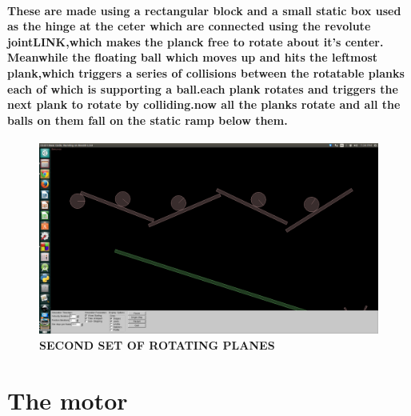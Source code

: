 \paragraph{
These are made using a rectangular block and a small static box used as the hinge at the ceter which are connected using the revolute joint\textbf{LINK},which makes the planck free to rotate about it's center.
Meanwhile the floating  ball which                                moves up and hits the leftmost plank,which triggers a series of collisions between the rotatable planks each of which is supporting a ball.each plank rotates and triggers the next plank to rotate by colliding.now all the planks rotate and all the balls on them fall on the static ramp below them.
}
\begin{figure}[H]
  \centering
    \includegraphics[scale=0.2]{project/images/revolvers.png}
  \caption{\textbf{SECOND SET OF ROTATING PLANES}}
\end{figure}

\section{The motor}
